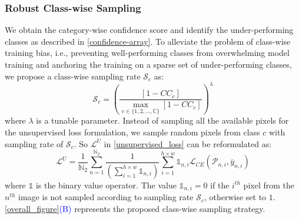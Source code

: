 \documentclass[runningheads]{llncs}
\begin{document}
\subsubsection{Robust Class-wise Sampling}
We obtain the category-wise confidence score and identify the under-performing classes as described in \autoref{confidence-array}. To alleviate the problem of class-wise training bias, i.e., preventing well-performing classes from overwhelming model training and anchoring the training on a sparse set of under-performing classes, we propose a class-wise sampling rate $\mathcal{S}_c$ as:
\begin{equation}\label{s_c}
    \mathcal{S}_c = \left( \frac{[1-CC_c]}{\max\limits_{c\in\{1,2,...,\mathbb{C}\}} [1-CC_c]}  \right)^\lambda
\end{equation}
where $\lambda$ is a tunable parameter. Instead of sampling all the available pixels for the unsupervised loss formulation, we sample random pixels from class $c$ with sampling rate of $\mathcal{S}_c$. So $\mathcal{L}^U$ in \autoref{unsupervised_loss} can be reformulated as:
\begin{equation}\label{sampling-loss}
    \mathcal{L}^U = \frac{1}{\mathbb{N}_2}\sum\limits_{n=1}^{\mathbb{N}_2}   \frac{1}{\left(\sum\limits_{i=1}^{h\times w}\mathds{1}_{n,i}\right)} \sum\limits_{i=1}^{h\times w} \mathds{1}_{n,i}\mathcal{L}_{CE}(\mathcal{P}_{n,i}, \bar{{y}}_{n,i})
\end{equation}
where $\mathds{1}$ is the binary value operator. The value $\mathds{1}_{n,i}=0$ if the $i^{th}$ pixel from the $n^{th}$ image is not sampled according to sampling rate $\mathcal{S}_c$, otherwise set to $1$. \autoref{overall_figure}\textcolor{blue}{(B)} represents the proposed class-wise sampling strategy. 
\end{document}
